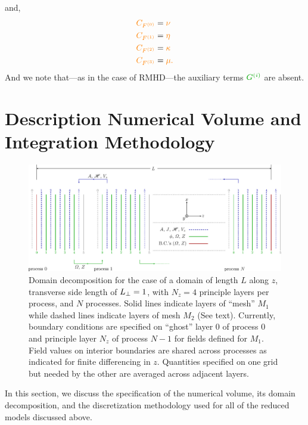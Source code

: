 \documentclass[12pt, letterpaper, oneside, leqno, openright]{memoir}
\begin{document}
%
and,
%
\begin{subequations}
\begin{align}
  {\color{orange}C_{F^{(0)}}}     &= {\color{orange}\nu   } \label{eq:ffczero}    \\
  {\color{orange}C_{F^{(1)}}}     &= {\color{orange}\eta  } \label{eq:ffcone}     \\
  {\color{orange}C_{F^{(2)}}}     &= {\color{orange}\kappa} \label{eq:ffctwo}     \\
  {\color{orange}C_{F^{(3)}}}     &= {\color{orange}\mu.  } \label{eq:ffcthree}
\end{align}
\end{subequations}
%
And we note that---as in the case of RMHD---the auxiliary
terms ${\color{green!65!black}G^{(i)}}$ are absent.
%
\par
%
\chapter{Description Numerical Volume and Integration Methodology}
%
\begin{figure}[ht]
  \centering
  \includegraphics[scale=0.5]{figtwo.eps}
  \caption{Domain decomposition for the case of a domain of length
           $L$ along $z$, transverse side length of $L_\perp=1$, with 
           $N_z=4$ principle layers per process, and $N$ processes.  
           Solid lines indicate layers of ``mesh'' $M_1$ while dashed 
           lines indicate layers of mesh $M_2$ (See text). Currently, 
           boundary conditions are specified on ``ghost'' layer $0$ of 
           process $0$ and principle layer $N_z$ of process $N-1$ for 
           fields defined for $M_1$. Field values on interior boundaries 
           are shared across processes as indicated for finite 
           differencing in $z$. Quantities specified on one grid but 
           needed by the other are averaged across adjacent 
           layers. 
           \label{fig:figtwo}
}
\end{figure}
%
In this section, we discuss the specification of the numerical volume, its
domain decomposition, and the discretization methodology used for all of
the reduced models discussed above.
%
\end{document}
